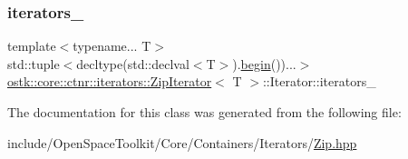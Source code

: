 \subsubsection{\texorpdfstring{iterators\+\_\+}{iterators\_}}
{\footnotesize\ttfamily template$<$typename... T$>$ \\
std\+::tuple$<$decltype(std\+::declval$<$T$>$).\hyperlink{classostk_1_1core_1_1ctnr_1_1iterators_1_1_zip_iterator_a9fd76a0b2306f00757c5a09accef725a}{begin}())...$>$ \hyperlink{classostk_1_1core_1_1ctnr_1_1iterators_1_1_zip_iterator}{ostk\+::core\+::ctnr\+::iterators\+::\+Zip\+Iterator}$<$ T $>$\+::Iterator\+::iterators\+\_\+}



The documentation for this class was generated from the following file\+:\begin{DoxyCompactItemize}
\item 
include/\+Open\+Space\+Toolkit/\+Core/\+Containers/\+Iterators/\hyperlink{_zip_8hpp}{Zip.\+hpp}\end{DoxyCompactItemize}
